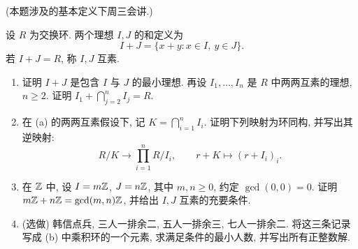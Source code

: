 \documentclass{article}
\begin{document}
\begin{problem}
(本题涉及的基本定义下周三会讲.)

设 $R$ 为交换环. 两个理想 $I,J$ 的和定义为
\[
  I+J=\{x+y:x\in I,\ y\in J\}.
\]
若 $I+J=R$, 称 $I,J$ 互素.
\begin{enumerate}
  \item[(a)] 证明 $I+J$ 是包含 $I$ 与 $J$ 的最小理想. 再设 $I_1,\ldots,I_n$ 是 $R$ 中两两互素的理想, $n\geq 2$. 证明 $I_1+\bigcap_{j=2}^n I_j=R$.
  \item[(b)] 在 (a) 的两两互素假设下, 记 $K=\bigcap_{i=1}^n I_i$. 证明下列映射为环同构, 并写出其逆映射:
  \[
    R/K\longrightarrow\prod_{i=1}^n R/I_i,\qquad r+K\longmapsto(r+I_i)_i.
  \]
  \item[(c)] 在 $\mathbb{Z}$ 中, 设 $I=m\mathbb{Z}$, $J=n\mathbb{Z}$, 其中 $m,n\geq 0$, 约定 $\gcd(0,0)=0$. 证明 $m\mathbb{Z}+n\mathbb{Z}=\gcd(m,n)\mathbb{Z}$, 并给出 $I,J$ 互素的充要条件.
  \item[(d)] ({\heiti 选做}) 韩信点兵, 三人一排余二, 五人一排余三, 七人一排余二. 将这三条记录写成 (b) 中乘积环的一个元素, 求满足条件的最小人数, 并写出所有正整数解.
\end{enumerate}
\end{problem}
\end{document}
